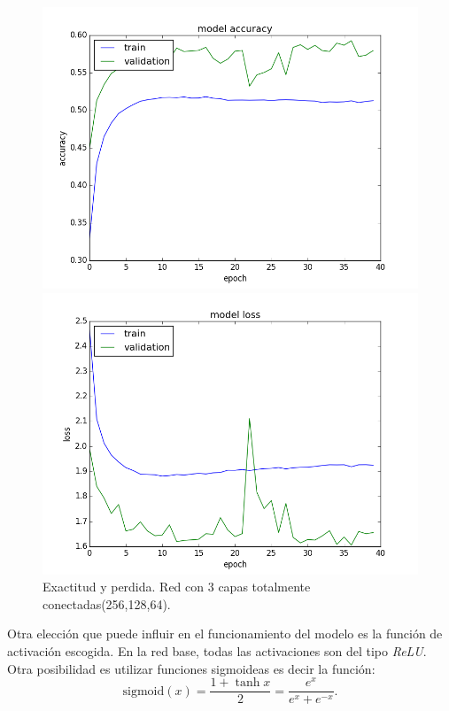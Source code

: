 \documentclass{article}[12pt, a4paper]
\begin{document}
\begin{figure}[h!]
	\begin{minipage}[h]{0.49\textwidth}
		\includegraphics[width=\textwidth]{ej3cmoreacc}
	\end{minipage}
	\begin{minipage}[h]{0.49\textwidth}
		\includegraphics[width=\textwidth]{ej3cmoreloss}
	\end{minipage}
	\caption{Exactitud y perdida. Red con 3 capas totalmente conectadas(256,128,64).}
	\label{ej3c2}
\end{figure}

\newpage
Otra elecci\'on que puede influir en el funcionamiento del modelo es la
funci\'on de activaci\'on escogida. En la red base, todas las activaciones
son del tipo \textit{ReLU}. Otra posibilidad es utilizar funciones sigmoideas
es decir la funci\'on:
\[\mathrm{sigmoid}(x)=\frac{1+\tanh{x}}{2}=\frac{e^x}{e^x+e^{-x}}.\]
\end{document}
